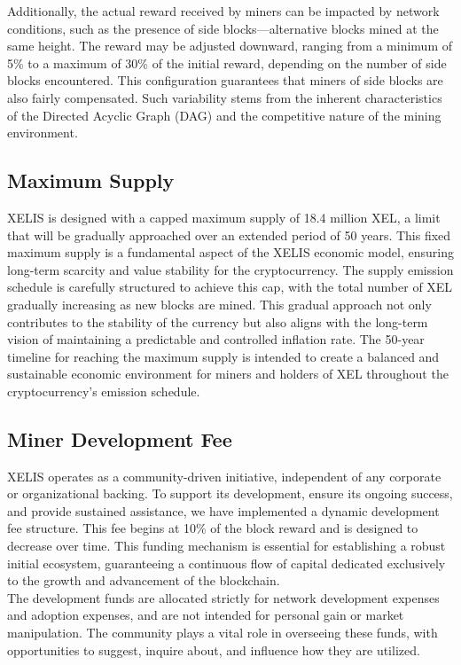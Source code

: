 \documentclass[10pt,a4paper,twocolumn]{article}
\begin{document}
Additionally, the actual reward received by miners can be impacted by network conditions, such as the presence of side blocks—alternative blocks mined at the same height. The reward may be adjusted downward, ranging from a minimum of 5\% to a maximum of 30\% of the initial reward, depending on the number of side blocks encountered. This configuration guarantees that miners of side blocks are also fairly compensated. Such variability stems from the inherent characteristics of the Directed Acyclic Graph (DAG) and the competitive nature of the mining environment.


\subsection{Maximum Supply}
XELIS is designed with a capped maximum supply of 18.4 million XEL, a limit that will be gradually approached over an extended period of 50 years. This fixed maximum supply is a fundamental aspect of the XELIS economic model, ensuring long-term scarcity and value stability for the cryptocurrency. The supply emission schedule is carefully structured to achieve this cap, with the total number of XEL gradually increasing as new blocks are mined. This gradual approach not only contributes to the stability of the currency but also aligns with the long-term vision of maintaining a predictable and controlled inflation rate. The 50-year timeline for reaching the maximum supply is intended to create a balanced and sustainable economic environment for miners and holders of XEL throughout the cryptocurrency's emission schedule.
\subsection{Miner Development Fee}

XELIS operates as a community-driven initiative, independent of any corporate or organizational backing. To support its development, ensure its ongoing success, and provide sustained assistance, we have implemented a dynamic development fee structure. This fee begins at 10\% of the block reward and is designed to decrease over time. This funding mechanism is essential for establishing a robust initial ecosystem, guaranteeing a continuous flow of capital dedicated exclusively to the growth and advancement of the blockchain.\\

The development funds are allocated strictly for network development expenses and adoption expenses, and are not intended for personal gain or market manipulation. The community plays a vital role in overseeing these funds, with opportunities to suggest, inquire about, and influence how they are utilized.\\
\end{document}
